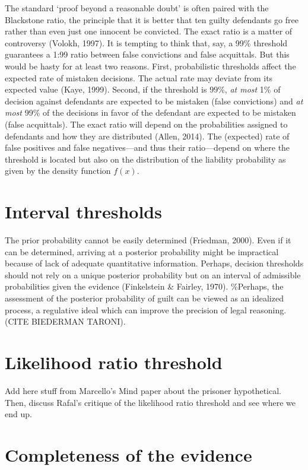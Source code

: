 \documentclass[10pt,dvipsnames]{scrartcl}
\begin{document}
The standard `proof beyond a reasonable doubt' is often paired with the
Blackstone ratio, the principle that it is better that ten guilty
defendants go free rather than even just one innocent be convicted. The
exact ratio is a matter of controversy (Volokh, 1997). It is tempting to
think that, say, a 99\% threshold guarantees a 1:99 ratio between false
convictions and false acquittals. But this would be hasty for at least
two reasons. First, probabilistic thresholds affect the expected rate of
mistaken decisions. The actual rate may deviate from its expected value
(Kaye, 1999). Second, if the threshold is \(99\%\), \textit{at most} 1\%
of decision against defendants are expected to be mistaken (false
convictions) and \textit{at most} 99\% of the decisions in favor of the
defendant are expected to be mistaken (false acquittals). The exact
ratio will depend on the probabilities assigned to defendants and how
they are distributed (Allen, 2014). The (expected) rate of false
positives and false negatives---and thus their ratio---depend on where
the threshold is located but also on the distribution of the liability
probability as given by the density function \(f(x)\).

\section{Interval thresholds}\label{interval-thresholds}

The prior probability cannot be easily determined (Friedman, 2000). Even
if it can be determined, arriving at a posterior probability might be
impractical because of lack of adequate quantitative information.
Perhaps, decision thresholds should not rely on a unique posterior
probability but on an interval of admissible probabilities given the
evidence (Finkelstein \& Fairley, 1970). \%Perhaps, the assessment of
the posterior probability of guilt can be viewed as an idealized
process, a regulative ideal which can improve the precision of legal
reasoning. (CITE BIEDERMAN TARONI).

\section{Likelihood ratio threshold}\label{likelihood-ratio-threshold}

Add here stuff from Marcello's Mind paper about the prisoner
hypothetical. Then, discuss Rafal's critique of the likelihood ratio
threshold and see where we end up.

\section{Completeness of the
evidence}\label{completeness-of-the-evidence}
\end{document}
